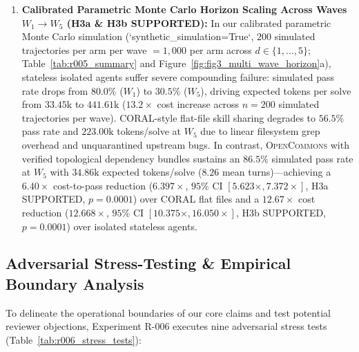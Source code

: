 \documentclass[10pt,twocolumn]{article}
\begin{document}
\begin{enumerate}
    \item \textbf{Calibrated Parametric Monte Carlo Horizon Scaling Across Waves $W_1 \to W_5$ (H3a \& H3b SUPPORTED):} In our calibrated parametric Monte Carlo simulation (`synthetic\_simulation=True`, $200$ simulated trajectories per arm per wave $= 1{,}000$ per arm across $d \in \{1,\dots,5\}$; Table~\ref{tab:r005_summary} and Figure~\ref{fig:fig3_multi_wave_horizon}a), stateless isolated agents suffer severe compounding failure: simulated pass rate drops from $80.0\%$ ($W_1$) to $30.5\%$ ($W_5$), driving expected tokens per solve from $33.45\text{k}$ to $441.61\text{k}$ ($13.2\times$ cost increase across $n=200$ simulated trajectories per wave). \textsc{CORAL}-style flat-file skill sharing degrades to $56.5\%$ pass rate and $223.00\text{k}$ tokens/solve at $W_5$ due to linear filesystem grep overhead and unquarantined upstream bugs. In contrast, \textsc{OpenCommons} with verified topological dependency bundles sustains an $86.5\%$ simulated pass rate at $W_5$ with $34.86\text{k}$ expected tokens/solve ($8.26$ mean turns)—achieving a $6.40\times$ cost-to-pass reduction ($6.397\times$, $95\%$ CI $[5.623\times, 7.372\times]$, H3a SUPPORTED, $p = 0.0001$) over \textsc{CORAL} flat files and a $12.67\times$ cost reduction ($12.668\times$, $95\%$ CI $[10.375\times, 16.050\times]$, H3b SUPPORTED, $p = 0.0001$) over isolated stateless agents.
\end{enumerate}

\subsection{Adversarial Stress-Testing \& Empirical Boundary Analysis}
\label{sec:exp_r006}

\begin{table}[t]
\centering
\caption{\textbf{Adversarial claim stress-testing and empirical boundary evaluation across nine modules (R-006).} Auto-generated by \texttt{ResearchHarness} from \texttt{runs/R-006/results.json}.}
\label{tab:r006_stress_tests}
\footnotesize
\resizebox{\textwidth}{!}{%
%
}
\end{table}

To delineate the operational boundaries of our core claims and test potential reviewer objections, Experiment R-006 executes nine adversarial stress tests (Table~\ref{tab:r006_stress_tests}):
\end{document}
